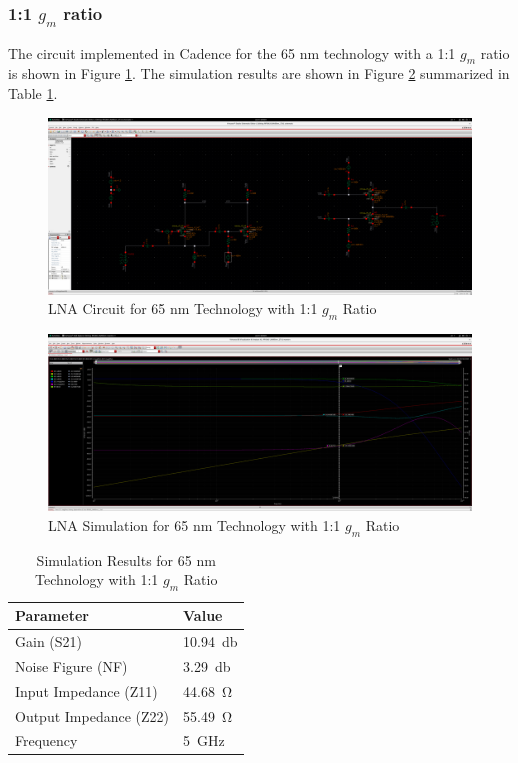 \subsubsection{1:1 $g_m$ ratio}

The circuit implemented in Cadence for the 65 nm technology with a 1:1 $g_m$ ratio is shown in Figure \ref{fig:65nm_1to1-circ}. The simulation results are shown in Figure \ref{fig:65nm_1to1} summarized in Table \ref{tab:65nm_1to1_results}.
\begin{figure}[H]
    \centering
    \includegraphics[width=1\textwidth]{Images/65nm1To1Circ.png}
    \caption{LNA Circuit for 65 nm Technology with 1:1 $g_m$ Ratio}
    \label{fig:65nm_1to1-circ}
\end{figure}

\begin{figure}[H]
    \centering
    \includegraphics[width=1\textwidth]{Images/65nm1to1.png}
    \caption{LNA Simulation for 65 nm Technology with 1:1 $g_m$ Ratio}
    \label{fig:65nm_1to1}
\end{figure}

\begin{table}[H]
    \centering
    \caption{Simulation Results for 65 nm Technology with 1:1 $g_m$ Ratio}
    \begin{tabularx}{\textwidth}{>{\centering\arraybackslash}X >{\centering\arraybackslash}X }
        \toprule
        \textbf{Parameter} & \textbf{Value}\\
        \midrule
        Gain (S21) & \SI{10.94}{\decibel} \\
        \midrule
        Noise Figure (NF) & \SI{3.29}{\decibel} \\
        \midrule
        Input Impedance (Z11) & \SI{44.68}{\ohm} \\
        \midrule
        Output Impedance (Z22) & \SI{55.49}{\ohm} \\
        \midrule
        Frequency & \SI{5}{\giga \hertz}\\
        \bottomrule
    \end{tabularx}
    \label{tab:65nm_1to1_results}
\end{table}


